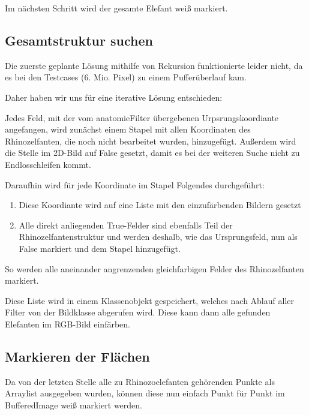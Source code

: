 		Im nächsten Schritt wird der gesamte Elefant weiß markiert.

	\subsection {Gesamtstruktur suchen}
	Die zuerste geplante Lösung mithilfe von Rekursion funktionierte leider nicht, da es bei den Testcases (6. Mio. Pixel) zu einem Pufferüberlauf kam.

	Daher haben wir uns für eine iterative Lösung entschieden:

	Jedes Feld, mit der vom anatomieFilter übergebenen Urpsrungskoordiante angefangen, wird zunächst einem Stapel mit allen Koordinaten des Rhinozelfanten, die noch nicht bearbeitet wurden, hinzugefügt. Außerdem wird die Stelle im 2D-Bild auf False gesetzt, damit es bei der weiteren Suche nicht zu Endlosschleifen kommt.

	Daraufhin wird für jede Koordinate im Stapel Folgendes durchgeführt:

	\begin{enumerate}
		\item Diese Koordiante wird auf eine Liste mit den einzufärbenden Bildern gesetzt
		\item Alle direkt anliegenden True-Felder sind ebenfalls Teil der Rhinozelfantenstruktur und werden deshalb, wie das Ursprungsfeld, nun als False markiert und dem Stapel hinzugefügt.
	\end{enumerate}

	So werden alle aneinander angrenzenden gleichfarbigen Felder des Rhinozelfanten markiert. 

	Diese Liste wird in einem Klassenobjekt gespeichert, welches nach Ablauf aller Filter von der Bildklasse abgerufen wird. Diese kann dann alle gefunden Elefanten im RGB-Bild einfärben.

	\subsection {Markieren der Flächen}

	Da von der letzten Stelle alle zu Rhinozoelefanten gehörenden Punkte als Arraylist ausgegeben wurden, können diese nun einfach Punkt für Punkt im BufferedImage weiß markiert werden.